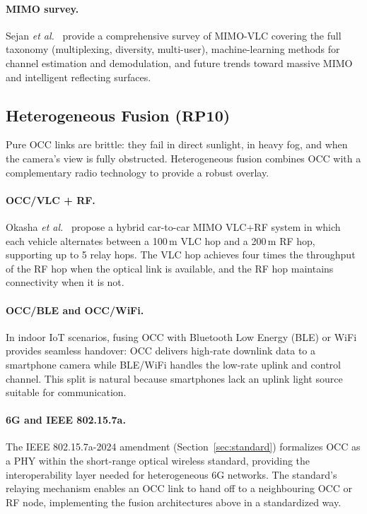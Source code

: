 \documentclass[10pt,a4paper]{article}
\newcommand{\rp}[1]{\textbf{RP#1}}
\begin{document}
\paragraph{MIMO survey.}
Sejan \emph{et al.}~\cite{sejan2023survey} provide a comprehensive
survey of MIMO-VLC covering the full taxonomy (multiplexing, diversity,
multi-user), machine-learning methods for channel estimation and
demodulation, and future trends toward massive MIMO and intelligent
reflecting surfaces.

\subsection{Heterogeneous Fusion ($\rp{10}$)}
\label{sec:rp10}

Pure OCC links are brittle: they fail in direct sunlight, in heavy fog,
and when the camera's view is fully obstructed. Heterogeneous fusion
combines OCC with a complementary radio technology to provide a robust
overlay.

\paragraph{OCC/VLC + RF.}
Okasha \emph{et al.}~\cite{okasha2022hybrid} propose a hybrid car-to-car
MIMO VLC+RF system in which each vehicle alternates between a 100\,m VLC
hop and a 200\,m RF hop, supporting up to 5 relay hops. The VLC hop
achieves four times the throughput of the RF hop when the optical link
is available, and the RF hop maintains connectivity when it is not.

\paragraph{OCC/BLE and OCC/WiFi.}
In indoor IoT scenarios, fusing OCC with Bluetooth Low Energy (BLE) or
WiFi provides seamless handover: OCC delivers high-rate downlink data to
a smartphone camera while BLE/WiFi handles the low-rate uplink and
control channel. This split is natural because smartphones lack an
uplink light source suitable for communication.

\paragraph{6G and IEEE 802.15.7a.}
The IEEE 802.15.7a-2024 amendment (Section~\ref{sec:standard})
formalizes OCC as a PHY within the short-range optical wireless
standard, providing the interoperability layer needed for heterogeneous
6G networks. The standard's relaying mechanism enables an OCC link to
hand off to a neighbouring OCC or RF node, implementing the fusion
architectures above in a standardized way.
\end{document}
